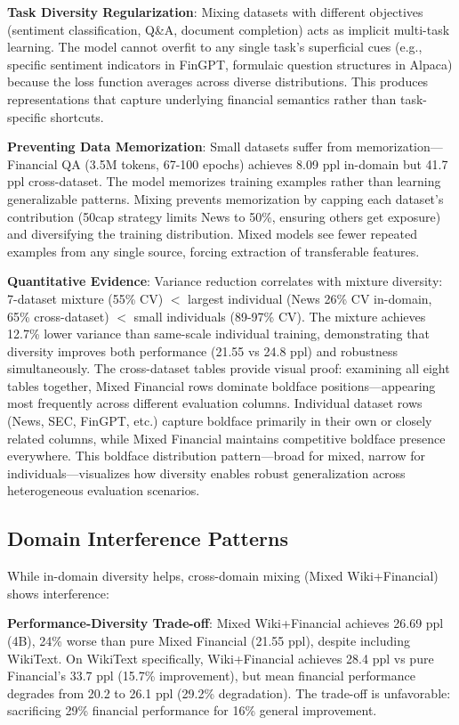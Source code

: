 \textbf{Task Diversity Regularization}: Mixing datasets with different objectives (sentiment classification, Q\&A, document completion) acts as implicit multi-task learning. The model cannot overfit to any single task's superficial cues (e.g., specific sentiment indicators in FinGPT, formulaic question structures in Alpaca) because the loss function averages across diverse distributions. This produces representations that capture underlying financial semantics rather than task-specific shortcuts.

\textbf{Preventing Data Memorization}: Small datasets suffer from memorization—Financial QA (3.5M tokens, 67-100 epochs) achieves 8.09 ppl in-domain but 41.7 ppl cross-dataset. The model memorizes training examples rather than learning generalizable patterns. Mixing prevents memorization by capping each dataset's contribution (50cap strategy limits News to 50\%, ensuring others get exposure) and diversifying the training distribution. Mixed models see fewer repeated examples from any single source, forcing extraction of transferable features.

\textbf{Quantitative Evidence}: Variance reduction correlates with mixture diversity: 7-dataset mixture (55\% CV) $<$ largest individual (News 26\% CV in-domain, 65\% cross-dataset) $<$ small individuals (89-97\% CV). The mixture achieves 12.7\% lower variance than same-scale individual training, demonstrating that diversity improves both performance (21.55 vs 24.8 ppl) and robustness simultaneously. The cross-dataset tables provide visual proof: examining all eight tables together, Mixed Financial rows dominate boldface positions—appearing most frequently across different evaluation columns. Individual dataset rows (News, SEC, FinGPT, etc.) capture boldface primarily in their own or closely related columns, while Mixed Financial maintains competitive boldface presence everywhere. This boldface distribution pattern—broad for mixed, narrow for individuals—visualizes how diversity enables robust generalization across heterogeneous evaluation scenarios.

\subsection{Domain Interference Patterns}

While in-domain diversity helps, cross-domain mixing (Mixed Wiki+Financial) shows interference:

\textbf{Performance-Diversity Trade-off}: Mixed Wiki+Financial achieves 26.69 ppl (4B), 24\% worse than pure Mixed Financial (21.55 ppl), despite including WikiText. On WikiText specifically, Wiki+Financial achieves 28.4 ppl vs pure Financial's 33.7 ppl (15.7\% improvement), but mean financial performance degrades from 20.2 to 26.1 ppl (29.2\% degradation). The trade-off is unfavorable: sacrificing 29\% financial performance for 16\% general improvement.


